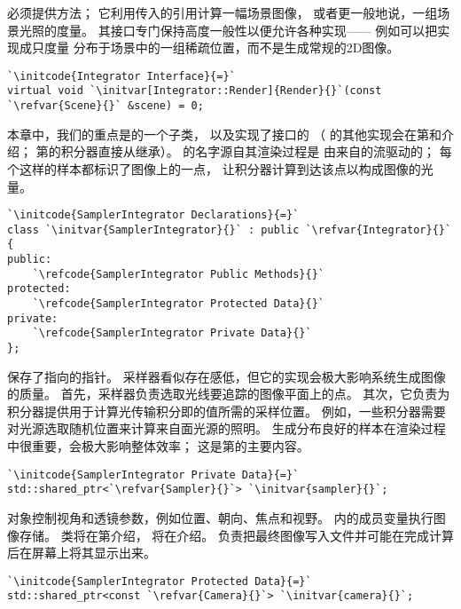 必须提供方法；
它利用传入的引用计算一幅场景图像，
或者更一般地说，一组场景光照的度量。
其接口专门保持高度一般性以便允许各种实现——
例如可以把实现成只度量
分布于场景中的一组稀疏位置，而不是生成常规的2D图像。
\begin{lstlisting}
`\initcode{Integrator Interface}{=}`
virtual void `\initvar[Integrator::Render]{Render}{}`(const `\refvar{Scene}{}` &scene) = 0;
\end{lstlisting}

本章中，我们的重点是的一个子类，
以及实现了接口的
（
的其他实现会在第和介绍；
第的积分器直接从继承）。
的名字源自其渲染过程是
由来自的流驱动的；
每个这样的样本都标识了图像上的一点，
让积分器计算到达该点以构成图像的光量。
\begin{lstlisting}
`\initcode{SamplerIntegrator Declarations}{=}`
class `\initvar{SamplerIntegrator}{}` : public `\refvar{Integrator}{}` {
public:
    `\refcode{SamplerIntegrator Public Methods}{}`
protected:
    `\refcode{SamplerIntegrator Protected Data}{}`
private:
    `\refcode{SamplerIntegrator Private Data}{}`
};
\end{lstlisting}

保存了指向的指针。
采样器看似存在感低，但它的实现会极大影响系统生成图像的质量。
首先，采样器负责选取光线要追踪的图像平面上的点。
其次，它负责为积分器提供用于计算光传输积分即的值所需的采样位置。
例如，一些积分器需要对光源选取随机位置来计算来自面光源的照明。
生成分布良好的样本在渲染过程中很重要，会极大影响整体效率；
这是第的主要内容。
\begin{lstlisting}
`\initcode{SamplerIntegrator Private Data}{=}`
std::shared_ptr<`\refvar{Sampler}{}`> `\initvar{sampler}{}`;
\end{lstlisting}

对象控制视角和透镜参数，例如位置、朝向、焦点和视野。
内的成员变量执行图像存储。
类将在第介绍，
将在介绍。
负责把最终图像写入文件并可能在完成计算后在屏幕上将其显示出来。
\begin{lstlisting}
`\initcode{SamplerIntegrator Protected Data}{=}`
std::shared_ptr<const `\refvar{Camera}{}`> `\initvar{camera}{}`;
\end{lstlisting}


